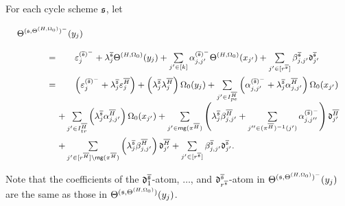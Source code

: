 For each cycle scheme ${\mathfrak{s} }$, let
%
\[
\small
\def\arraystretch{2}
\begin{array}{r l l}
\smallskip
\sumf^{(\schm,\sumf^{(H,\initval_0)})^-}(y_j)  & & \\
 & \hspace{-16mm} = & \hspace{-10mm}  \cste^{(\circled{\schm})^-}_{j} + \cstl^{\circled{\schm}}_j \sumf^{(H,\initval_0)}(y_j)  + \sum \limits_{j' \in [k]}  \csta^{(\circled{\schm})^-}_{j,j'}  \sumf^{(H,\initval_0)}(x_{j'}) + \sum \limits_{j' \in [r^{\circled{\schm}}]} \cstb^{\circled{\schm}}_{j,j'} \vard^{\circled{\schm}}_{j'}  \\
	& \hspace{-16mm} = & \hspace{-10mm}  
	\left( \cste^{(\circled{\schm})^-}_{j}+ \cstl^{\circled{\schm}}_{j} \cste^{\circled{H}}_{j}\right)+ \left(\cstl^{\circled{\schm}}_{j} \cstl^{\circled{H}}_{j} \right) \initval_0(y_j)+  \sum \limits_{j' \in I^{\circled{H}}_{pe}} 
	\left(\csta^{(\circled{\schm})^-}_{j,j'} +\cstl^{\circled{\schm}}_{j} \csta^{\circled{H}}_{j,j'}\right) \initval_0(x_{j'}) \\
	& &   \hspace{-16mm} + \sum \limits_{j' \in  I^{\circled{H}}_{tr}} 
	\left(\cstl^{\circled{\schm}}_{j} \csta^{\circled{H}}_{j,j'} \right) \initval_0(x_{j'}) + 	\sum \limits_{j' \in \rng(\pi^{\circled{H}})} \left(\cstl^{\circled{\schm}}_{j} \cstb^{\circled{H}}_{j,j'}+  \sum \limits_{j'' \in (\pi^{\circled{H}})^{-1}(j')} \csta^{(\circled{\schm})^-}_{j,j''} \right) \vard^{\circled{H}}_{j'} \\
	& & 
\hspace{-16mm} +  \sum \limits_{j' \in [r^{\circled{H}}]\setminus \rng(\pi^{\circled{H}})} \left( \cstl^{\circled{\schm}}_{j} \cstb^{\circled{H}}_{j,j'} \right) \vard^{\circled{H}}_{j'} +
	\sum \limits_{j'\in[r^{\circled{\schm}}]} \cstb^{\circled{\schm}}_{j,j'} \vard^{\circled{\schm}}_{j'}.
	\end{array}
\]
 
Note that the coefficients of the $\mathfrak{d}^{\overline{{\mathfrak{s} }}}_1$-atom, $\dots$, and $\mathfrak{d}^{\overline{{\mathfrak{s} }}}_{r^{\overline{{\mathfrak{s} }}}}$-atom in $\Theta^{({\mathfrak{s} },\Theta^{(H,\Omega_0)})^-}(y_j)$ are the same as those in $\Theta^{({\mathfrak{s} },\Theta^{(H,\Omega_0)})}(y_j)$.

